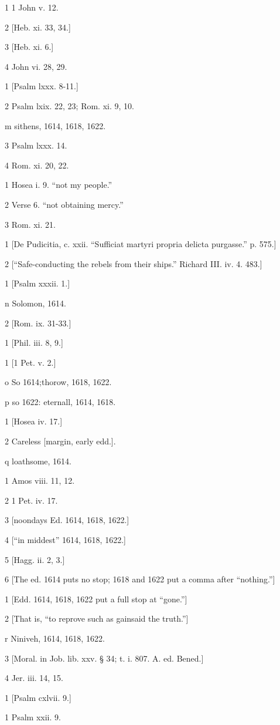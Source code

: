 1
1 John v. 12.

2
[Heb. xi. 33, 34.]

3
[Heb. xi. 6.]

4
John vi. 28, 29.

1
[Psalm lxxx. 8-11.]

2
Psalm lxix. 22, 23; Rom. xi. 9, 10.

m
sithens, 1614, 1618, 1622.

3
Psalm lxxx. 14.

4
Rom. xi. 20, 22.

1
Hosea i. 9. “not my people.”

2
Verse 6. “not obtaining mercy.”

3
Rom. xi. 21.

1
[De Pudicitia, c. xxii. “Sufficiat martyri propria delicta purgasse.” p. 575.]

2
[“Safe-conducting the rebels from their ships.” Richard III. iv. 4. 483.]

1
[Psalm xxxii. 1.]

n
Solomon, 1614.

2
[Rom. ix. 31-33.]

1
[Phil. iii. 8, 9.]

1
[1 Pet. v. 2.]

o
So 1614;thorow, 1618, 1622.

p
so 1622: eternall, 1614, 1618.

1
[Hosea iv. 17.]

2
Careless [margin, early edd.].

q
loathsome, 1614.

1
Amos viii. 11, 12.

2
1 Pet. iv. 17.

3
[noondays Ed. 1614, 1618, 1622.]

4
[“in middest” 1614, 1618, 1622.]

5
[Hagg. ii. 2, 3.]

6
[The ed. 1614 puts no stop; 1618 and 1622 put a comma after “nothing.”]

1
[Edd. 1614, 1618, 1622 put a full stop at “gone.”]

2
[That is, “to reprove such as gainsaid the truth.”]

r
Niniveh, 1614, 1618, 1622.

3
[Moral. in Job. lib. xxv. § 34; t. i. 807. A. ed. Bened.]

4
Jer. iii. 14, 15.

1
[Psalm cxlvii. 9.]

1
Psalm xxii. 9.

